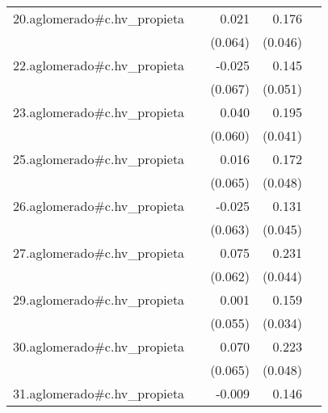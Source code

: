 {\begin{longtable}{l*{4}{D{.}{.}{-1}}}
\addlinespace
20.aglomerado#c.hv\_propieta&                     &       0.021         &       0.176\sym{***}&                     \\
            &                     &     (0.064)         &     (0.046)         &                     \\
\addlinespace
22.aglomerado#c.hv\_propieta&                     &      -0.025         &       0.145\sym{**} &                     \\
            &                     &     (0.067)         &     (0.051)         &                     \\
\addlinespace
23.aglomerado#c.hv\_propieta&                     &       0.040         &       0.195\sym{***}&                     \\
            &                     &     (0.060)         &     (0.041)         &                     \\
\addlinespace
25.aglomerado#c.hv\_propieta&                     &       0.016         &       0.172\sym{***}&                     \\
            &                     &     (0.065)         &     (0.048)         &                     \\
\addlinespace
26.aglomerado#c.hv\_propieta&                     &      -0.025         &       0.131\sym{**} &                     \\
            &                     &     (0.063)         &     (0.045)         &                     \\
\addlinespace
27.aglomerado#c.hv\_propieta&                     &       0.075         &       0.231\sym{***}&                     \\
            &                     &     (0.062)         &     (0.044)         &                     \\
\addlinespace
29.aglomerado#c.hv\_propieta&                     &       0.001         &       0.159\sym{***}&                     \\
            &                     &     (0.055)         &     (0.034)         &                     \\
\addlinespace
30.aglomerado#c.hv\_propieta&                     &       0.070         &       0.223\sym{***}&                     \\
            &                     &     (0.065)         &     (0.048)         &                     \\
\addlinespace
31.aglomerado#c.hv\_propieta&                     &      -0.009         &       0.146\sym{**} &                     \\

\end{longtable}}
